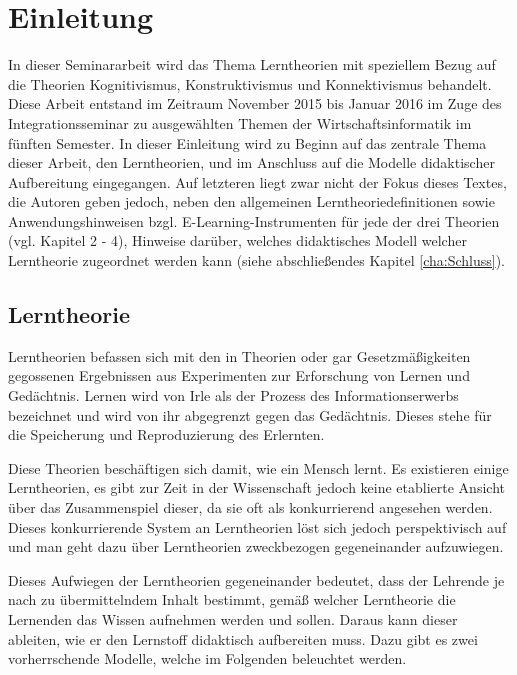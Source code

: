 \chapter{Einleitung}
\label{cha:Einleitung}
In dieser Seminararbeit wird das Thema Lerntheorien mit speziellem Bezug auf die Theorien Kognitivismus, Konstruktivismus und Konnektivismus behandelt. Diese Arbeit entstand im Zeitraum November 2015 bis Januar 2016 im Zuge des Integrationsseminar zu ausgewählten Themen der Wirtschaftsinformatik im fünften Semester. In dieser Einleitung wird zu Beginn auf das zentrale Thema dieser Arbeit, den Lerntheorien, und im Anschluss auf die Modelle didaktischer Aufbereitung eingegangen. Auf letzteren liegt zwar nicht der Fokus dieses Textes, die Autoren geben jedoch, neben den allgemeinen Lerntheoriedefinitionen sowie Anwendungshinweisen bzgl. E-Learning-Instrumenten für jede der drei Theorien (vgl. Kapitel 2 - 4), Hinweise darüber, welches didaktisches Modell welcher Lerntheorie zugeordnet werden kann (siehe abschließendes Kapitel \ref{cha:Schluss}). 

\section{Lerntheorie}
\label{sec:Lerntheorie}
Lerntheorien befassen sich mit den in Theorien oder gar Gesetzmäßigkeiten gegossenen Ergebnissen aus Experimenten zur Erforschung von Lernen und Gedächtnis. Lernen wird von Irle als der Prozess des Informationserwerbs bezeichnet und wird von ihr abgegrenzt gegen das Gedächtnis. Dieses stehe für die Speicherung und Reproduzierung des Erlernten. \cite[S.122]{Irle.1986}

Diese Theorien beschäftigen sich damit, wie ein Mensch lernt. \cite{Reinmann.2013} Es existieren einige Lerntheorien, es gibt zur Zeit in der Wissenschaft jedoch keine etablierte Ansicht über das Zusammenspiel dieser, da sie oft als konkurrierend angesehen werden. \cite[S. 172 f.]{Weinert.1996} Dieses konkurrierende System an Lerntheorien löst sich jedoch perspektivisch auf \cite{WittKerres.2002} und man geht dazu über Lerntheorien zweckbezogen gegeneinander aufzuwiegen. \cite{Reinmann.2013} %

Dieses Aufwiegen der Lerntheorien gegeneinander bedeutet, dass der Lehrende je nach zu übermittelndem Inhalt bestimmt, gemäß welcher Lerntheorie die Lernenden das Wissen aufnehmen werden und sollen. Daraus kann dieser ableiten, wie er den Lernstoff didaktisch aufbereiten muss. Dazu gibt es zwei vorherrschende Modelle, welche im Folgenden beleuchtet werden. 

